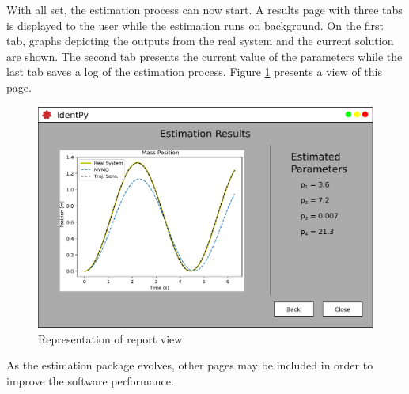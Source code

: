 With all set, the estimation process can now start. A results page with three tabs is displayed to the user while the estimation runs on background. On the first tab, graphs depicting the outputs from the real system and the current solution are shown. The second tab presents the current value of the parameters while the last tab saves a log of the estimation process. Figure \ref{fig: final_pg} presents a view of this page.

\begin{figure}[h]
	\caption{Representation of report view}
	\begin{center}
		\includegraphics[scale=.5]{Images/Software_final_pg.eps}
	\end{center}
	\label{fig: final_pg}
\end{figure}

As the estimation package evolves, other pages may be included in order to improve the software performance.